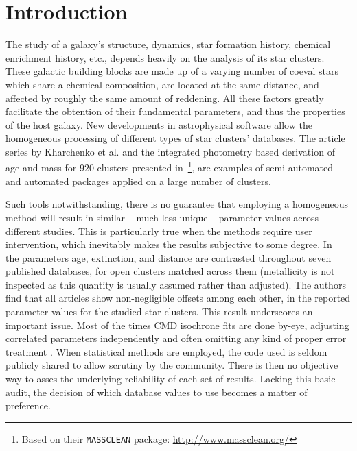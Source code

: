 \documentclass[a4paper,fleqn,usenatbib]{mnras}
\begin{document}
\section{Introduction}
\label{sec:intro}

The study of a galaxy's structure, dynamics, star formation history, chemical
enrichment history, etc., depends heavily on the analysis of its star clusters.
These galactic building blocks are made up of a varying number of coeval stars
which share a chemical composition, are located at the same distance, and
affected by roughly the same amount of reddening. All these factors greatly
facilitate the obtention of their fundamental parameters, and thus the
properties of the host galaxy.
%
New developments in astrophysical software allow the homogeneous
processing of different types of star clusters' databases. The article series
by Kharchenko et al. 
\citep[see][and references therein]{Kharchenko_2005,Schmeja_2014}
and the integrated photometry based derivation of age and mass for 920 clusters
presented
in~\cite{Popescu_2012}\footnote{Based on their \texttt{MASSCLEAN} package:
\url{http://www.massclean.org/}}, are examples of semi-automated and
automated packages applied on a large number of clusters.

Such tools notwithstanding, there is no guarantee that employing a homogeneous
method will result in similar -- much less unique -- parameter values
across different studies. This is particularly true when the methods require
user intervention, which inevitably makes the results subjective to some degree.
%
In~\cite{Netopil_2015} the parameters age, extinction, and distance are
contrasted throughout seven published databases, for open clusters matched
across them (metallicity is not inspected as this quantity is usually assumed
rather than adjusted).
The authors find that all articles show non-negligible offsets among each
other, in the reported parameter values for the studied star clusters.
%
This result underscores an important issue.
Most of the times CMD isochrone fits are done by-eye, adjusting correlated
parameters independently and often omitting any kind of proper error treatment
\citep[see][for a more detailed description of this problem]{vonHippel_2014}.
When statistical methods are employed, the code used is seldom publicly shared
to allow scrutiny by the community. There is then no objective way to asses the
underlying reliability of each set of results.
Lacking this basic audit, the decision of which database values to use
becomes a matter of preference.
\end{document}
